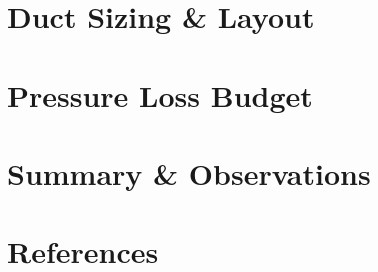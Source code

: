 \documentclass[report]{lirn}
\begin{document}

\section{Duct Sizing \& Layout}


\section{Pressure Loss Budget}


\section{Summary \& Observations}


\section{References}


\lirnend[Document]

\lirndisclaimers
\end{document}
